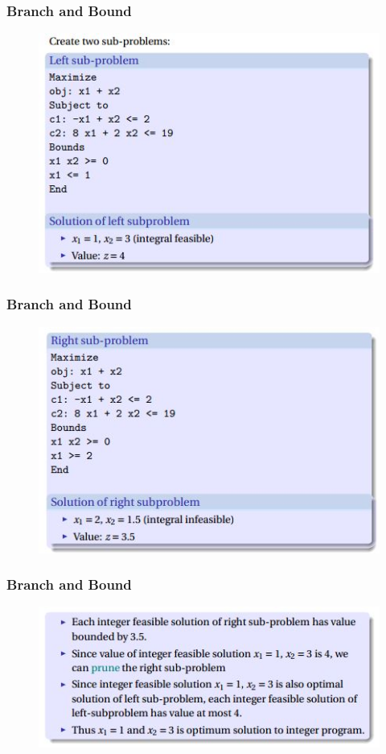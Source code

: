 \documentclass{beamer}
\begin{document}
\begin{frame}
	\frametitle{Branch and Bound}
	\Large
	\begin{figure}
		\centering
		\includegraphics[width=0.7\linewidth]{BranchBound4}
	\end{figure}
	
\end{frame}
\begin{frame}
	\frametitle{Branch and Bound}
	\Large
	\begin{figure}
		\centering
		\includegraphics[width=0.7\linewidth]{BranchBound5}
	\end{figure}
	
\end{frame}
\begin{frame}
	\frametitle{Branch and Bound}
	\Large
	\begin{figure}
		\centering
		\includegraphics[width=0.7\linewidth]{BranchBound6}
	\end{figure}
	
\end{frame}
\end{document}
